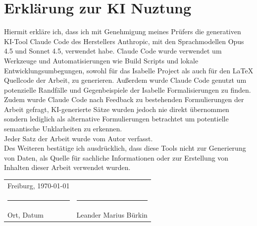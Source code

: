 \section*{Erklärung zur KI Nuztung}

\bigskip
\bigskip
\bigskip

%
Hiermit erkläre ich, dass ich mit Genehmigung meines Prüfers die
generativen KI-Tool Claude Code des Herstellers Anthropic, mit den
Sprachmodellen Opus 4.5 und Sonnet 4.5, verwendet habe.
Claude Code wurde verwendet um Werkzeuge und Automatisierungen wie
Build Scripts und lokale Entwicklungsumbegungen, sowohl für das
Isabelle Project als auch für den LaTeX Quellcode der Arbeit, zu generieren.
Außerdem wurde Claude Code genutzt um potenzielle Randfälle und
Gegenbeispiele der Isabelle Formalisierungen zu finden.
Zudem wurde Claude Code nach Feedback zu bestehenden Formulierungen
der Arbeit gefragt, KI-generierte Sätze wurden jedoch nie direkt übernommen
sondern lediglich als alternative Formulierungen betrachtet um
potentielle semantische Unklarheiten zu erkennen. \\
Jeder Satz der Arbeit wurde vom Autor verfasst.\\
Des Weiteren bestätige ich ausdrücklich, dass diese Tools nicht
zur Generierung von Daten, als Quelle für sachliche Informationen
oder zur Erstellung von Inhalten dieser Arbeit verwendet wurden.

\bigskip
\bigskip
\bigskip
\bigskip
\bigskip
\bigskip

\begin{tabular}{p{} l}
  Freiburg, \today             &                              \\
  \rule{\textwidth*2/5}{0.4pt} & \rule{\textwidth*2/5}{0.4pt} \\
  Ort, Datum                   & Leander Marius Bürkin
\end{tabular}

\endgroup
